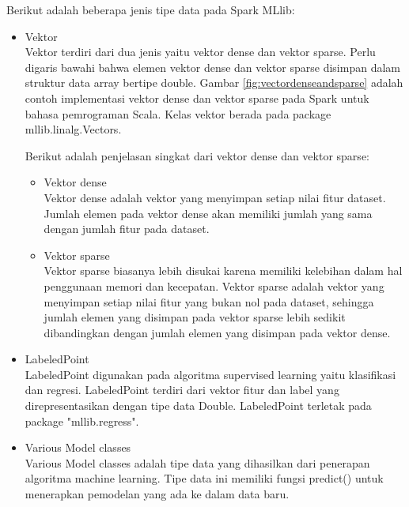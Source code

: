 \noindent Berikut adalah beberapa jenis tipe data pada Spark MLlib:

\begin{itemize}
\item Vektor\\
Vektor terdiri dari dua jenis yaitu vektor dense dan vektor sparse. Perlu digaris bawahi bahwa elemen vektor dense dan vektor sparse disimpan dalam struktur data array bertipe double. Gambar \ref{fig:vectordenseandsparse} adalah contoh implementasi vektor dense dan vektor sparse pada Spark untuk bahasa pemrograman Scala. Kelas vektor berada pada package mllib.linalg.Vectors. 

\noindent Berikut adalah penjelasan singkat dari vektor dense dan vektor sparse:

\begin{itemize}

\item Vektor dense\\
Vektor dense adalah vektor yang menyimpan setiap nilai fitur dataset. Jumlah elemen pada vektor dense akan memiliki jumlah yang sama dengan jumlah fitur pada dataset. \\

\item Vektor sparse\\
Vektor sparse biasanya lebih disukai karena memiliki kelebihan dalam hal penggunaan memori dan kecepatan. Vektor sparse adalah vektor yang menyimpan setiap nilai fitur yang bukan nol pada dataset, sehingga jumlah elemen yang disimpan pada vektor sparse lebih sedikit dibandingkan dengan jumlah elemen yang disimpan pada vektor dense. 

\end{itemize}

\item LabeledPoint\\
LabeledPoint digunakan pada algoritma supervised learning yaitu klasifikasi dan regresi. LabeledPoint terdiri dari vektor fitur dan label yang direpresentasikan dengan tipe data Double. LabeledPoint terletak pada package "mllib.regress".

\item Various Model classes\\
Various Model classes adalah tipe data yang dihasilkan dari penerapan algoritma machine learning. Tipe data ini memiliki fungsi predict() untuk menerapkan pemodelan yang ada ke dalam data baru.

\end{itemize}


